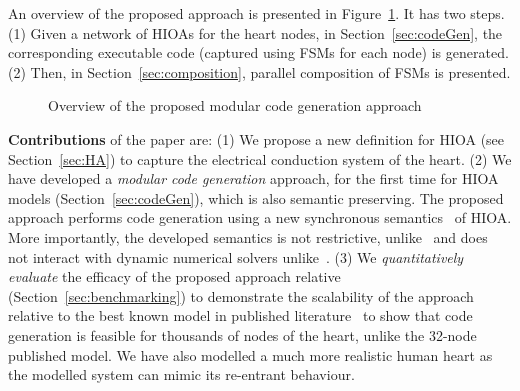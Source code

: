   
An overview of the proposed approach is presented in
Figure~\ref{fig:overview}. It has two steps.
(1) Given a network of \acp{HIOA} for the heart nodes,
in Section~\ref{sec:codeGen}, 
 the corresponding executable code (captured using
 \acp{FSM} for each node) is generated.
 (2) Then, in Section~\ref{sec:composition}, parallel composition of 
 \acp{FSM} is presented.


\begin{figure}[bthp]
  \centering
  \scalebox{0.7}{
    
  }
  \caption{Overview of the proposed modular 
    code generation approach \label{fig:overview}}
\end{figure}
      
\textbf{Contributions} of the paper are: (1) We propose a
new definition for \acf{HIOA} (see
Section~\ref{sec:HA}) to capture  the electrical conduction system of
the heart. (2) We have developed a \emph{modular code generation}
approach, for the first time for \ac{HIOA} models
(Section~\ref{sec:codeGen}), which is also semantic preserving.  The
proposed approach performs code generation using a new synchronous
semantics~\cite{benveniste03} of \ac{HIOA}. More importantly, the
developed semantics is not restrictive, unlike~\cite{alur2003generating,
  kim2003modular} and does not interact with dynamic numerical solvers
unlike~\cite{ptolemaeus2014system, bourke13zelus}.  (3) We
\emph{quantitatively evaluate} the efficacy of the proposed approach
relative \simulink (Section~\ref{sec:benchmarking}) to demonstrate the
scalability of the approach relative to the best known model in
published literature~\cite{chen14} to show that code generation is
feasible for thousands of nodes of the heart, unlike the 32-node
published model. We have also modelled a much more realistic human heart
as the modelled system can mimic its re-entrant behaviour.
 

 

